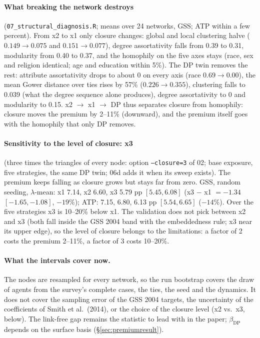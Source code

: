 \documentclass[11pt,a4paper]{article}
\newcommand{\code}[1]{\texttt{#1}}
\begin{document}
\paragraph{What breaking the network destroys} (\code{07\_structural\_diagnosis.R}; means over
24 networks, GSS; ATP within a few percent). From x2 to x1 only closure changes: global and
local clustering halve ($0.149 \to 0.075$ and $0.151 \to 0.077$), degree assortativity falls
from 0.39 to 0.31, modularity from 0.40 to 0.37, and the homophily on the five axes stays
(race, sex and religion identical; age and education within 5\%). The DP twin removes the
rest: attribute assortativity drops to about 0 on every axis (race $0.69 \to 0.00$), the
mean Gower distance over ties rises by 57\% ($0.226 \to 0.355$), clustering falls to 0.039
(what the degree sequence alone produces), degree assortativity to 0 and modularity to
0.15. x2 $\to$ x1 $\to$ DP thus separates closure from homophily: closure moves the premium by
2--11\% (downward), and the premium itself goes with the homophily that only DP removes.

\paragraph{Sensitivity to the level of closure: x3} (three times the triangles of every node:
option \code{--closure=3} of 02; base exposure, five strategies, the same DP twin; 06d adds
it when its sweep exists). The premium keeps falling as closure grows but stays
far from zero. GSS, random seeding, $\lambda$-mean: x1 7.14, x2 6.60, x3 5.79 pp $[5.45, 6.08]$
(x3 $-$ x1 $= -1.34$ $[-1.65, -1.08]$, $-19\%$); ATP: 7.15, 6.80, 6.13 pp $[5.54, 6.65]$
($-14\%$). Over the five strategies x3 is 10--20\% below x1. The validation does not pick
between x2 and x3 (both fall inside the GSS 2004 band with the embeddedness rule; x3 near
its upper edge), so the level of closure belongs to the limitations: a factor of 2 costs the
premium 2--11\%, a factor of 3 costs 10--20\%.

\paragraph{What the intervals cover now.} The nodes are resampled for every network, so the run
bootstrap covers the draw of agents from the survey's complete cases, the ties, the seed and
the dynamics. It does not cover the sampling error of the GSS 2004 targets, the uncertainty of
the coefficients of Smith et al.\ (2014), or the choice of the closure level (x2 vs.\ x3,
below). The link-free gap remains the statistic to lead with in the paper; $\beta_{\text{DP}}$
depends on the surface basis (\S\ref{sec:premiumresult}).
\end{document}
